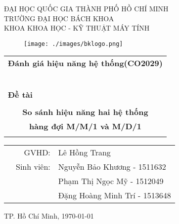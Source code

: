 \documentclass[a4paper]{article}
\newcommand{\monhoc}{Đánh giá hiệu năng hệ thống}
\begin{document}
\begin{titlepage}
\begin{center}
ĐẠI HỌC QUỐC GIA THÀNH PHỐ HỒ CHÍ MINH \\
TRƯỜNG ĐẠI HỌC BÁCH KHOA \\
KHOA KHOA HỌC - KỸ THUẬT MÁY TÍNH 
\end{center}

\vspace{1cm}

\begin{figure}[H]
\begin{center}
\texttt{[image: ./images/bklogo.png]}
\end{center}
\end{figure}

\vspace{1cm}


\begin{center}
\begin{tabular}{c}
\multicolumn{1}{l}{\textbf{{\Large \monhoc(CO2029)}}}\\
~~\\
\hline
\\
\multicolumn{1}{l}{\textbf{{\Large Đề tài}}}\\
\\
\textbf{{\Huge So sánh hiệu năng hai hệ thống}}\\
\textbf{{\Huge hàng đợi M/M/1 và M/D/1}}\\
\\
\hline
\end{tabular}
\end{center}

\vspace{3cm}

\begin{table}[h]
\begin{tabular}{rrl}
\vspace*{1em}
\hspace{5 cm} & GVHD: & Lê Hồng Trang\\
& Sinh viên: & Nguyễn Bảo Khương - 1511632 \\
& & Phạm Thị Ngọc Mỹ - 1512049\\
& & Đặng Hoàng Minh Trí - 1513648\\

\end{tabular}
\end{table}
\vspace*{\fill}
\begin{center}
{\footnotesize TP. Hồ Chí Minh, \today}
\end{center}
\end{titlepage}
\end{document}

